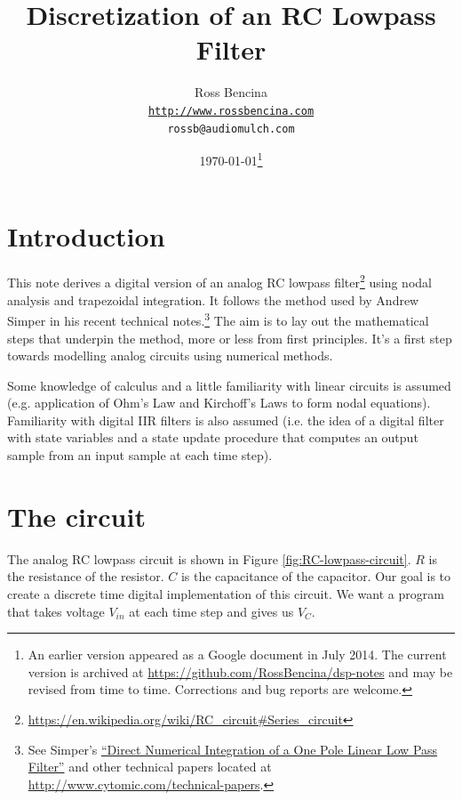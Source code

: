 \documentclass{article}
\begin{document}
\title{Discretization of an RC Lowpass Filter}
\author{
	Ross Bencina \\
	\texttt{\url{http://www.rossbencina.com}}\\
	\texttt{rossb@audiomulch.com}
}

\date{\today\footnote{An earlier version appeared as a Google document in July 2014. The current version is archived at \url{https://github.com/RossBencina/dsp-notes} and may be revised from time to time. Corrections and bug reports are welcome. }}
	
\maketitle

\section{Introduction}

This note derives a digital version of an
analog RC lowpass filter\footnote{\url{https://en.wikipedia.org/wiki/RC_circuit#Series_circuit}}
 using nodal analysis and trapezoidal integration.
It follows the method used by Andrew Simper in his recent technical notes.\footnote{See Simper's
\href{http://www.cytomic.com/files/dsp/OnePoleLinearLowPass.pdf}{``Direct Numerical Integration of a One Pole Linear Low Pass Filter''} and other technical papers located at
\url{http://www.cytomic.com/technical-papers}.}
The aim is to lay out the mathematical steps that underpin the method, more or less from first principles.
It's a first step towards modelling analog circuits using numerical methods.

Some knowledge of calculus and a little familiarity with linear circuits is assumed (e.g. application of Ohm's Law and Kirchoff's Laws to form nodal equations). Familiarity with digital IIR filters is also assumed (i.e. the idea of a digital filter with state variables and a state update procedure that computes an output sample from an input sample at each time step).

\section{The circuit}

The analog RC lowpass circuit is shown in Figure \ref{fig:RC-lowpass-circuit}.
$R$ is the resistance of the resistor. $C$ is the capacitance of the capacitor.
Our goal is to create a discrete time digital implementation of this circuit.
We want a program that takes voltage $V_{in}$ at each time step and gives us $V_{C}$.
\end{document}
